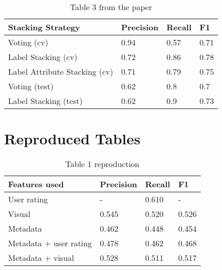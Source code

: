 \documentclass[sigconf]{acmart}
\begin{document}
\begin{table}[hbt!]
  \caption*{Table 3 from the paper}
  \begin{tabular}{llll}
    \hline
    Stacking Strategy             & Precision & Recall & F1   \\ \hline
    Voting (cv)                   & 0.94      & 0.57   & 0.71 \\
    Label Stacking (cv)           & 0.72      & 0.86   & 0.78 \\
    Label Attribute Stacking (cv) & 0.71      & 0.79   & 0.75 \\
    Voting (test)                 & 0.62      & 0.8    & 0.7  \\
    Label Stacking (test)         & 0.62      & 0.9    & 0.73 \\ \hline
  \end{tabular}
\end{table}

\newpage
\section{Reproduced Tables}
\begin{table}[hbt!]
  \caption*{Table 1 reproduction}
  \begin{tabular}{llll}
    \hline
    Features used          & Precision & Recall & F1    \\ \hline
    User rating            & -         & 0.610  & -     \\
    Visual                 & 0.545     & 0.520  & 0.526 \\
    Metadata               & 0.462     & 0.448  & 0.454 \\
    Metadata + user rating & 0.478     & 0.462  & 0.468 \\
    Metadata + visual      & 0.528     & 0.511  & 0.517 \\ \hline
  \end{tabular}
\end{table}
\end{document}
